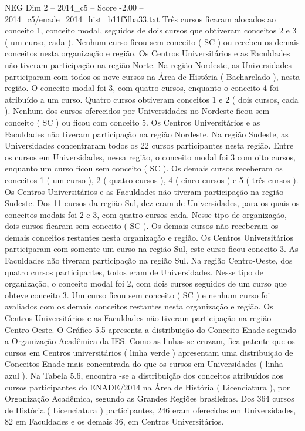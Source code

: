\begin{textsample}{NEG Dim 2 – 2014\_c5 – Score -2.00 – 2014\_c5/enade\_2014\_hist\_b11f5fba33.txt}
Três cursos ficaram alocados ao conceito 1, conceito modal, seguidos de dois cursos que obtiveram conceitos 2 e 3 ( um curso, cada ).
Nenhum curso ficou sem conceito ( SC ) ou recebeu os demais conceitos nesta organização e região.
Os Centros Universitários e as Faculdades não tiveram participação na região Norte.
Na região Nordeste, as Universidades participaram com todos os nove cursos na Área de História ( Bacharelado ), nesta região.
O conceito modal foi 3, com quatro cursos, enquanto o conceito 4 foi atribuído a um curso.
Quatro cursos obtiveram conceitos 1 e 2 ( dois cursos, cada ).
Nenhum dos cursos oferecidos por Universidades no Nordeste ficou sem conceito ( SC ) ou ficou com conceito 5.
Os Centros Universitários e as Faculdades não tiveram participação na região Nordeste.
Na região Sudeste, as Universidades concentraram todos os 22 cursos participantes nesta região.
Entre os cursos em Universidades, nessa região, o conceito modal foi 3 com oito cursos, enquanto um curso ficou sem conceito ( SC ).
Os demais cursos receberam os conceitos 1 ( um curso ), 2 ( quatro cursos ), 4 ( cinco cursos ) e 5 ( três cursos ).
Os Centros Universitários e as Faculdades não tiveram participação na região Sudeste.
Dos 11 cursos da região Sul, dez eram de Universidades, para os quais os conceitos modais foi 2 e 3, com quatro cursos cada.
Nesse tipo de organização, dois cursos ficaram sem conceito ( SC ).
Os demais cursos não receberam os demais conceitos restantes nesta organização e região.
Os Centros Universitários participaram com somente um curso na região Sul, este curso ficou conceito 3.
As Faculdades não tiveram participação na região Sul.
Na região Centro-Oeste, dos quatro cursos participantes, todos eram de Universidades.
Nesse tipo de organização, o conceito modal foi 2, com dois cursos seguidos de um curso que obteve conceito 3.
Um curso ficou sem conceito ( SC ) e nenhum curso foi avaliados com os demais conceitos restantes nesta organização e região.
Os Centros Universitários e as Faculdades não tiveram participação na região Centro-Oeste.
O Gráfico 5.5 apresenta a distribuição do Conceito Enade segundo a Organização Acadêmica da IES.
Como as linhas se cruzam, fica patente que os cursos em Centros universitários ( linha verde ) apresentam uma distribuição de Conceitos Enade mais concentrada do que os cursos em Universidades ( linha azul ).
Na Tabela 5.6, encontra -se a distribuição dos conceitos atribuídos aos cursos participantes do ENADE/2014 na Área de História ( Licenciatura ), por Organização Acadêmica, segundo as Grandes Regiões brasileiras.
Dos 364 cursos de História ( Licenciatura ) participantes, 246 eram oferecidos em Universidades, 82 em Faculdades e os demais 36, em Centros Universitários.

\end{textsample}
